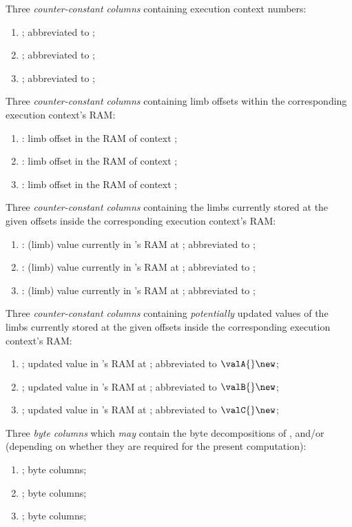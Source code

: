 Three \emph{counter-constant columns} containing execution context numbers:
\begin{enumerate}
	\item \CNA{}; abbreviated to \cnA{};
	\item \CNB{}; abbreviated to \cnB{};
	\item \CNC{}; abbreviated to \cnC{};
\end{enumerate}
Three \emph{counter-constant columns} containing limb offsets within the corresponding execution context's RAM:
\begin{enumerate}[resume]
	\item \indexA{}: limb offset in the RAM of context \cnA{};
	\item \indexB{}: limb offset in the RAM of context \cnB{};
	\item \indexC{}: limb offset in the RAM of context \cnC{};
\end{enumerate}
Three \emph{counter-constant columns} containing the limbs currently stored at the given offsets inside the corresponding execution context's RAM:
\begin{enumerate}[resume]
	\item \VALA{}: (limb) value currently in \cnA{}'s RAM at \indexA{}; abbreviated to \valA{};
	\item \VALB{}: (limb) value currently in \cnB{}'s RAM at \indexB{}; abbreviated to \valB{};
	\item \VALC{}: (limb) value currently in \cnC{}'s RAM at \indexC{}; abbreviated to \valC{};
\end{enumerate}
Three \emph{counter-constant columns} containing \emph{potentially} updated values of the limbs currently stored at the given offsets inside the corresponding execution context's RAM:
\begin{enumerate}[resume]
	\item \VALANEW{}; updated value in \cnA{}'s RAM at \indexA{}; abbreviated to $\valA{}\new$;
	\item \VALBNEW{}; updated value in \cnB{}'s RAM at \indexB{}; abbreviated to $\valB{}\new$;
	\item \VALCNEW{}; updated value in \cnC{}'s RAM at \indexC{}; abbreviated to $\valC{}\new$;
\end{enumerate}
Three \emph{byte columns} which \emph{may} contain the byte decompositions of \valA{}, \valB{} and/or \valC{} (depending on whether they are required for the present computation):
\begin{enumerate}[resume]
	\item \BYTEA{}; byte columns; %
	\item \BYTEB{}; byte columns; %
	\item \BYTEC{}; byte columns; %
\end{enumerate}
